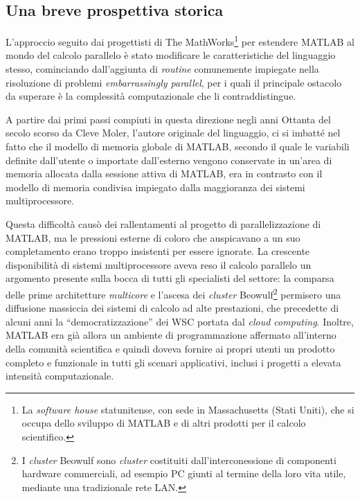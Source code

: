 \nocite{Sharma2009}
\subsection{Una breve prospettiva storica}
L'approccio seguito dai progettisti di The MathWorks\footnote{La \textit{software house} statunitense, con sede in Massachusetts (Stati Uniti), che si occupa dello sviluppo di MATLAB e di altri prodotti per il calcolo scientifico.}
per estendere MATLAB  al mondo del calcolo parallelo \`e stato modificare le caratteristiche del linguaggio 
stesso, cominciando dall'aggiunta di \textit{routine} comunemente impiegate nella risoluzione di problemi \textit{embarrassingly parallel}, per i quali il principale ostacolo da superare \`e la complessit\`a computazionale che li contraddistingue. 

A partire dai primi passi compiuti in questa direzione negli anni Ottanta del secolo scorso da Cleve Moler, l'autore originale del linguaggio, ci si imbatt\'e
nel fatto che il modello di memoria globale di MATLAB, secondo il quale le variabili definite dall'utente o importate dall'esterno vengono conservate 
in un'area di memoria allocata dalla sessione attiva di MATLAB, era in contrasto con il modello di memoria condivisa impiegato dalla maggioranza dei sistemi 
multiprocessore.

Questa difficoltà causò dei rallentamenti al progetto di parallelizzazione di MATLAB, ma le pressioni esterne di coloro che auspicavano a un suo completamento erano troppo insistenti per essere ignorate.\newline
La crescente disponibilit\`a di sistemi multiprocessore aveva reso il calcolo parallelo un argomento presente sulla bocca di tutti gli specialisti del 
settore: la comparsa delle prime architetture \textit{multicore} e l'ascesa dei \textit{cluster} Beowulf\footnote{I \textit{cluster} Beowulf sono \textit{cluster} costituiti dall'interconessione di componenti hardware commerciali, ad esempio PC giunti al termine della loro vita utile, mediante una tradizionale rete LAN. } permisero una diffusione massiccia dei sistemi di calcolo ad alte prestazioni, che precedette di alcuni anni la \enquote{democratizzazione} dei WSC portata dal \textit{cloud computing}.\newline   
Inoltre, MATLAB era gi\`a allora un ambiente di programmazione affermato all'interno della comunit\`a scientifica e quindi doveva fornire ai propri utenti un prodotto completo e funzionale 
in tutti gli scenari applicativi, inclusi i progetti a elevata intensit\`a computazionale.

